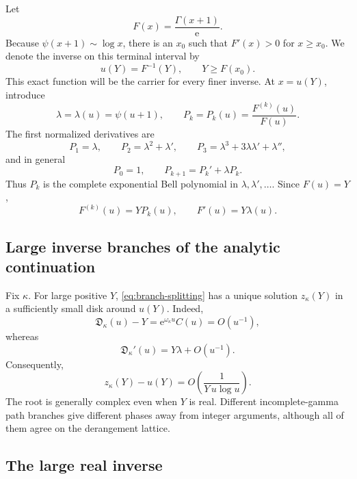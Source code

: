 \documentclass[11pt]{article}
\numberwithin{equation}{section}
\theoremstyle{mainthm}
\theoremstyle{defstyle}
\theoremstyle{remark}
\newcommand{\e}{\mathrm e}
\newcommand{\Dsub}{\mathfrak D}
\begin{document}
Let
\begin{equation}\label{eq:envelope-def}
 F(x)=\frac{\Gamma(x+1)}{\e}.
\end{equation}
Because \(\psi(x+1)\sim\log x\), there is an \(x_0\) such that \(F'(x)>0\) for \(x\ge x_0\).  We denote the inverse on this terminal interval by
\begin{equation}\label{eq:u-def}
 u(Y)=F^{-1}(Y),\qquad Y\ge F(x_0).
\end{equation}
This exact function will be the carrier for every finer inverse.  At \(x=u(Y)\), introduce
\begin{equation}\label{eq:lambda-def}
 \lambda=\lambda(u)=\psi(u+1),
 \qquad
 P_k=P_k(u)=\frac{F^{(k)}(u)}{F(u)}.
\end{equation}
The first normalized derivatives are
\begin{equation}\label{eq:Pk-first}
 P_1=\lambda,
 \qquad P_2=\lambda^2+\lambda',
 \qquad P_3=\lambda^3+3\lambda\lambda'+\lambda'',
\end{equation}
and in general
\begin{equation}\label{eq:Pk-recurrence}
 P_0=1,\qquad P_{k+1}=P_k'+\lambda P_k.
\end{equation}
Thus \(P_k\) is the complete exponential Bell polynomial in \(\lambda,\lambda',\ldots\).  Since \(F(u)=Y\),
\begin{equation}\label{eq:F-derivatives-at-u}
 F^{(k)}(u)=Y P_k(u),\qquad F'(u)=Y\lambda(u).
\end{equation}

\subsection{Large inverse branches of the analytic continuation}

Fix \(\kappa\).  For large positive \(Y\), \cref{eq:branch-splitting} has a unique solution \(z_\kappa(Y)\) in a sufficiently small disk around \(u(Y)\).  Indeed,
\[
 \Dsub_\kappa(u)-Y=\e^{\omega_\kappa u}C(u)=O(u^{-1}),
\]
whereas
\[
 \Dsub_\kappa'(u)=Y\lambda+O(u^{-1}).
\]
Consequently,
\begin{equation}\label{eq:analytic-root-displacement-size}
 z_\kappa(Y)-u(Y)
 =O\!\left(\frac{1}{Y\,u\log u}\right).
\end{equation}
The root is generally complex even when \(Y\) is real.  Different incomplete-gamma path branches give different phases away from integer arguments, although all of them agree on the derangement lattice.

\subsection{The large real inverse}
\end{document}
